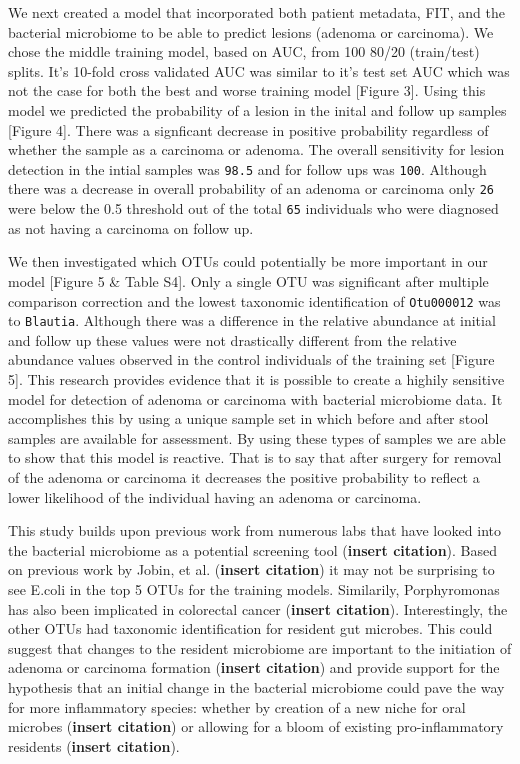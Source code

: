 \documentclass[12pt,]{article}
\begin{document}
We next created a model that incorporated both patient metadata, FIT,
and the bacterial microbiome to be able to predict lesions (adenoma or
carcinoma). We chose the middle training model, based on AUC, from 100
80/20 (train/test) splits. It's 10-fold cross validated AUC was similar
to it's test set AUC which was not the case for both the best and worse
training model {[}Figure 3{]}. Using this model we predicted the
probability of a lesion in the inital and follow up samples {[}Figure
4{]}. There was a signficant decrease in positive probability regardless
of whether the sample as a carcinoma or adenoma. The overall sensitivity
for lesion detection in the intial samples was \texttt{98.5} and for
follow ups was \texttt{100}. Although there was a decrease in overall
probability of an adenoma or carcinoma only \texttt{26} were below the
0.5 threshold out of the total \texttt{65} individuals who were
diagnosed as not having a carcinoma on follow up.

We then investigated which OTUs could potentially be more important in
our model {[}Figure 5 \& Table S4{]}. Only a single OTU was significant
after multiple comparison correction and the lowest taxonomic
identification of \texttt{Otu000012} was to \texttt{Blautia}. Although
there was a difference in the relative abundance at initial and follow
up these values were not drastically different from the relative
abundance values observed in the control individuals of the training set
{[}Figure 5{]}. This research provides evidence that it is possible to
create a highily sensitive model for detection of adenoma or carcinoma
with bacterial microbiome data. It accomplishes this by using a unique
sample set in which before and after stool samples are available for
assessment. By using these types of samples we are able to show that
this model is reactive. That is to say that after surgery for removal of
the adenoma or carcinoma it decreases the positive probability to
reflect a lower likelihood of the individual having an adenoma or
carcinoma.

This study builds upon previous work from numerous labs that have looked
into the bacterial microbiome as a potential screening tool
(\textbf{insert citation}). Based on previous work by Jobin, et al.
(\textbf{insert citation}) it may not be surprising to see E.coli in the
top 5 OTUs for the training models. Similarily, Porphyromonas has also
been implicated in colorectal cancer (\textbf{insert citation}).
Interestingly, the other OTUs had taxonomic identification for resident
gut microbes. This could suggest that changes to the resident microbiome
are important to the initiation of adenoma or carcinoma formation
(\textbf{insert citation}) and provide support for the hypothesis that
an initial change in the bacterial microbiome could pave the way for
more inflammatory species: whether by creation of a new niche for oral
microbes (\textbf{insert citation}) or allowing for a bloom of existing
pro-inflammatory residents (\textbf{insert citation}).
\end{document}

